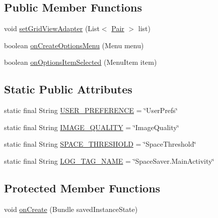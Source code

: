 \subsection*{Public Member Functions}
\begin{DoxyCompactItemize}
\item 
void \hyperlink{classcourse_1_1examples_1_1spacesaver_1_1_main_activity_a53620ebc69e8c3b33626ede6c952cc6c}{set\+Grid\+View\+Adapter} (List$<$ \hyperlink{classcourse_1_1examples_1_1spacesaver_1_1_pair}{Pair} $>$ list)
\item 
boolean \hyperlink{classcourse_1_1examples_1_1spacesaver_1_1_main_activity_a02f312998957aefd4c7a932532e48615}{on\+Create\+Options\+Menu} (Menu menu)
\item 
boolean \hyperlink{classcourse_1_1examples_1_1spacesaver_1_1_main_activity_a819d87dc906ff944c4f60cc044f05498}{on\+Options\+Item\+Selected} (Menu\+Item item)
\end{DoxyCompactItemize}
\subsection*{Static Public Attributes}
\begin{DoxyCompactItemize}
\item 
static final String \hyperlink{classcourse_1_1examples_1_1spacesaver_1_1_main_activity_a62fba147272fa9f0399c82fdd08dbc82}{U\+S\+E\+R\+\_\+\+P\+R\+E\+F\+E\+R\+E\+N\+C\+E} = \char`\"{}User\+Prefs\char`\"{}
\item 
static final String \hyperlink{classcourse_1_1examples_1_1spacesaver_1_1_main_activity_a02332766acdcc44702cbfaee00c0b7ec}{I\+M\+A\+G\+E\+\_\+\+Q\+U\+A\+L\+I\+T\+Y} = \char`\"{}Image\+Quality\char`\"{}
\item 
static final String \hyperlink{classcourse_1_1examples_1_1spacesaver_1_1_main_activity_a73bec883ca93d8c9c0691b1233f08f38}{S\+P\+A\+C\+E\+\_\+\+T\+H\+R\+E\+S\+H\+O\+L\+D} = \char`\"{}Space\+Threshold\char`\"{}
\item 
static final String \hyperlink{classcourse_1_1examples_1_1spacesaver_1_1_main_activity_a3151df70b338956cfe81e014cfba50fc}{L\+O\+G\+\_\+\+T\+A\+G\+\_\+\+N\+A\+M\+E} = \char`\"{}Space\+Saver.\+Main\+Activity\char`\"{}
\end{DoxyCompactItemize}
\subsection*{Protected Member Functions}
\begin{DoxyCompactItemize}
\item 
void \hyperlink{classcourse_1_1examples_1_1spacesaver_1_1_main_activity_a03e5171f1ff658442936a03ef4caf7a3}{on\+Create} (Bundle saved\+Instance\+State)
\end{DoxyCompactItemize}


